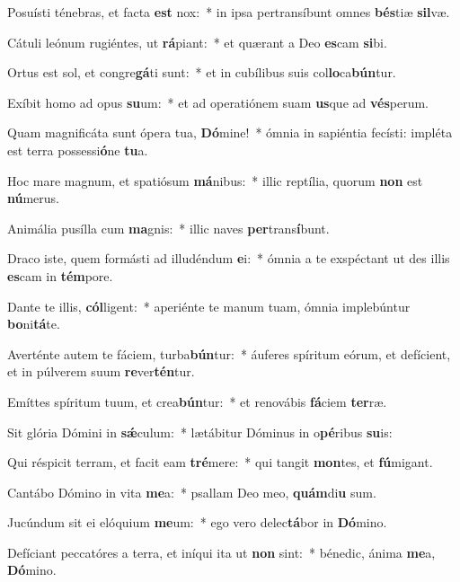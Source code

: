 \item Posuísti ténebras, et facta \textbf{est} nox:~* in ipsa pertransíbunt omnes \textbf{bés}tiæ \textbf{sil}væ.
\item Cátuli leónum rugiéntes, ut \textbf{rá}piant:~* et quærant a Deo \textbf{es}cam \textbf{si}bi.
\item Ortus est sol, et congre\textbf{gá}ti sunt:~* et in cubílibus suis col\textbf{lo}ca\textbf{bún}tur.
\item Exíbit homo ad opus \textbf{su}um:~* et ad operatiónem suam \textbf{us}que ad \textbf{vés}perum.
\item Quam magnificáta sunt ópera tua, \textbf{Dó}mine!~* ómnia in sapiéntia fecísti: impléta est terra possessi\textbf{ó}ne \textbf{tu}a.
\item Hoc mare magnum, et spatiósum \textbf{má}nibus:~* illic reptília, quorum \textbf{non} est \textbf{nú}merus.
\item Animália pusílla cum \textbf{ma}gnis:~* illic naves \textbf{per}trans\textbf{í}bunt.
\item Draco iste, quem formásti ad illudéndum \textbf{e}i:~* ómnia a te exspéctant ut des illis \textbf{es}cam in \textbf{tém}pore.
\item Dante te illis, \textbf{cól}ligent:~* aperiénte te manum tuam, ómnia implebúntur \textbf{bo}ni\textbf{tá}te.
\item Averténte autem te fáciem, turba\textbf{bún}tur:~* áuferes spíritum eórum, et defícient, et in púlverem suum \textbf{re}ver\textbf{tén}tur.
\item Emíttes spíritum tuum, et crea\textbf{bún}tur:~* et renovábis \textbf{fá}ciem \textbf{ter}ræ.
\item Sit glória Dómini in \textbf{sǽ}culum:~* lætábitur Dóminus in o\textbf{pé}ribus \textbf{su}is:
\item Qui réspicit terram, et facit eam \textbf{tré}mere:~* qui tangit \textbf{mon}tes, et \textbf{fú}migant.
\item Cantábo Dómino in vita \textbf{me}a:~* psallam Deo meo, \textbf{quám}di\textbf{u} sum.
\item Jucúndum sit ei elóquium \textbf{me}um:~* ego vero delec\textbf{tá}bor in \textbf{Dó}mino.
\item Defíciant peccatóres a terra, et iníqui ita ut \textbf{non} sint:~* bénedic, ánima \textbf{me}a, \textbf{Dó}mino.

